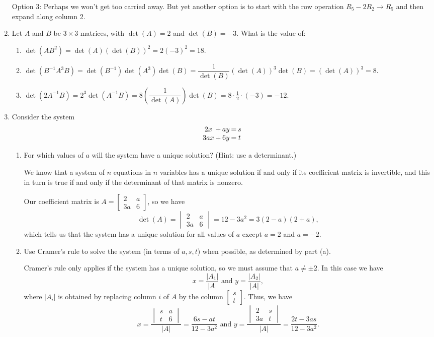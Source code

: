 \documentclass[12pt]{article}
\newcommand{\abs}[1]{\lvert #1\rvert}
\newcommand{\bbm}{\begin{bmatrix}}
\newcommand{\ebm}{\end{bmatrix}}
\newcommand{\bvm}{\begin{vmatrix}}
\newcommand{\evm}{\end{vmatrix}}
\begin{document}
\begin{enumerate}
Option 3: Perhaps we won't get too carried away. But yet another option is to start with the row operation $R_5-2R_2\to R_5$ and then expand along column 2.
 \newpage
 
 \item Let $A$ and $B$ be $3\times 3$ matrices, with $\det(A)=2$ and $\det(B)=-3$. What is the value of:
 \begin{enumerate}
 \item $\det(AB^2)=\det(A)(\det(B))^2=2(-3)^2=18.$
 

 
 \item $\det(B^{-1}A^3B)=\det(B^{-1})\det(A^3)\det(B)=\dfrac{1}{\det(B)}(\det(A))^3\det(B) = (\det(A))^3=8.$
 

 
 \item $\det(2A^{-1}B)=2^3\det(A^{-1}B)=8\left(\dfrac{1}{\det(A)}\right)\det(B)=8\cdot \frac12 \cdot (-3) = -12.$
 

 
\end{enumerate}
\item Consider the system
\[\arraycolsep=1pt
\begin{array}{ccccc}
2x&+&ay&=&s\\
3ax&+&6y&=&t
\end{array}
\]
\begin{enumerate}
\item For which values of $a$ will the system have a unique solution? (Hint: use a determinant.)

We know that a system of $n$ equations in $n$ variables has a unique solution if and only if its coefficient matrix is invertible, and this in turn is true if and only if the determinant of that matrix is nonzero.

Our coefficient matrix is $A=\bbm 2&a\\3a&6\ebm$, so we have
\[
\det(A) = \bvm 2&a\\3a&6\evm = 12-3a^2=3(2-a)(2+a),
\]
which tells us that the system has a unique solution for all values of $a$ except $a=2$ and $a=-2$.

\item Use Cramer's rule to solve the system (in terms of $a,s,t$) when possible, as determined by part (a).

Cramer's rule only applies if the system has a unique solution, so we must assume that $a\neq \pm 2$. In this case we have
\[
x=\frac{\abs{A_1}}{\abs{A}} \text{ and } y = \frac{\abs{A_2}}{\abs{A}},
\]
where $\abs{A_i}$ is obtained by replacing column $i$ of $A$ by the column $\bbm s\\t\ebm$. Thus, we have
\[
x = \frac{\bvm s&a\\t&6\evm}{\abs{A}} = \frac{6s-at}{12-3a^2}\text{ and }
y = \frac{\bvm 2&s\\3a&t\evm}{\abs{A}} = \frac{2t-3as}{12-3a^2}.
\]
\end{enumerate}

 \end{enumerate}
\end{document}
